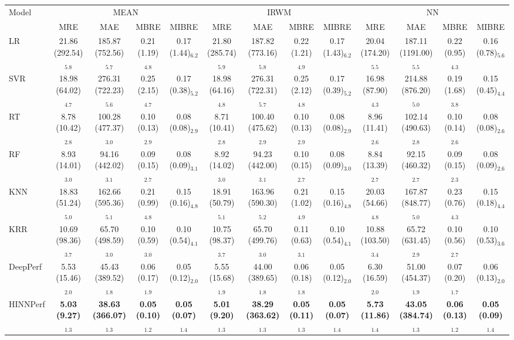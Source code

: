 \begin{tabular}{lcccccccccccc}
\toprule
Model & \multicolumn{4}{c}{MEAN} & \multicolumn{4}{c}{IRWM} & \multicolumn{4}{c}{NN} \\
& MRE & MAE & MBRE & MIBRE & MRE & MAE & MBRE & MIBRE & MRE & MAE & MBRE & MIBRE \\
\midrule
LR & 21.86 (292.54)$_{5.8}$ & 185.87 (752.56)$_{5.7}$ & 0.21 (1.19)$_{4.8}$ & 0.17 (1.44)$_{6.2}$ & 21.80 (285.74)$_{5.9}$ & 187.82 (773.16)$_{5.8}$ & 0.22 (1.21)$_{4.9}$ & 0.17 (1.43)$_{6.2}$ & 20.04 (174.20)$_{5.5}$ & 187.11 (1191.00)$_{5.5}$ & 0.22 (0.95)$_{4.3}$ & 0.16 (0.78)$_{5.6}$ \\
SVR & 18.98 (64.02)$_{4.7}$ & 276.31 (722.23)$_{5.6}$ & 0.25 (2.15)$_{4.7}$ & 0.17 (0.38)$_{5.2}$ & 18.98 (64.16)$_{4.8}$ & 276.31 (722.31)$_{5.7}$ & 0.25 (2.12)$_{4.8}$ & 0.17 (0.39)$_{5.2}$ & 16.98 (87.90)$_{4.3}$ & 214.88 (876.20)$_{5.0}$ & 0.19 (1.68)$_{3.8}$ & 0.15 (0.45)$_{4.4}$ \\
RT & 8.78 (10.42)$_{2.8}$ & 100.28 (477.37)$_{3.0}$ & 0.10 (0.13)$_{2.9}$ & 0.08 (0.08)$_{2.9}$ & 8.71 (10.41)$_{2.8}$ & 100.40 (475.62)$_{2.9}$ & 0.10 (0.13)$_{2.9}$ & 0.08 (0.08)$_{2.9}$ & 8.96 (11.41)$_{2.6}$ & 102.14 (490.63)$_{2.8}$ & 0.10 (0.14)$_{2.6}$ & 0.08 (0.08)$_{2.6}$ \\
RF & 8.93 (14.01)$_{3.0}$ & 94.16 (442.02)$_{3.1}$ & 0.09 (0.15)$_{2.7}$ & 0.08 (0.09)$_{3.1}$ & 8.92 (14.02)$_{3.0}$ & 94.23 (442.00)$_{3.1}$ & 0.10 (0.15)$_{2.7}$ & 0.08 (0.09)$_{3.0}$ & 8.84 (13.39)$_{2.7}$ & 92.15 (460.32)$_{2.7}$ & 0.09 (0.15)$_{2.3}$ & 0.08 (0.09)$_{2.6}$ \\
KNN & 18.83 (51.24)$_{5.0}$ & 162.66 (595.36)$_{5.1}$ & 0.21 (0.99)$_{4.8}$ & 0.15 (0.16)$_{4.8}$ & 18.91 (50.79)$_{5.1}$ & 163.96 (590.30)$_{5.2}$ & 0.21 (1.02)$_{4.9}$ & 0.15 (0.16)$_{4.8}$ & 20.03 (54.66)$_{4.8}$ & 167.87 (848.77)$_{5.0}$ & 0.23 (0.76)$_{4.3}$ & 0.15 (0.18)$_{4.4}$ \\
KRR & 10.69 (98.36)$_{3.7}$ & 65.70 (498.59)$_{3.0}$ & 0.10 (0.59)$_{3.0}$ & 0.10 (0.54)$_{4.1}$ & 10.75 (98.37)$_{3.7}$ & 65.70 (499.76)$_{3.0}$ & 0.11 (0.63)$_{3.1}$ & 0.10 (0.54)$_{4.1}$ & 10.88 (103.50)$_{3.4}$ & 65.72 (631.45)$_{2.9}$ & 0.10 (0.56)$_{2.7}$ & 0.10 (0.53)$_{3.6}$ \\
DeepPerf & 5.53 (15.46)$_{2.0}$ & 45.43 (389.52)$_{1.8}$ & 0.06 (0.17)$_{1.9}$ & 0.05 (0.12)$_{2.0}$ & 5.55 (15.68)$_{1.9}$ & 44.00 (389.65)$_{1.8}$ & 0.06 (0.18)$_{1.8}$ & 0.05 (0.12)$_{2.0}$ & 6.30 (16.59)$_{2.0}$ & 51.00 (454.37)$_{1.9}$ & 0.07 (0.20)$_{1.7}$ & 0.06 (0.13)$_{2.0}$ \\
HINNPerf & \textbf{5.03 (9.27)$_{1.3}$} & \textbf{38.63 (366.07)$_{1.3}$} & \textbf{0.05 (0.10)$_{1.2}$} & \textbf{0.05 (0.07)$_{1.4}$} & \textbf{5.01 (9.20)$_{1.3}$} & \textbf{38.29 (363.62)$_{1.3}$} & \textbf{0.05 (0.11)$_{1.3}$} & \textbf{0.05 (0.07)$_{1.4}$} & \textbf{5.73 (11.86)$_{1.4}$} & \textbf{43.05 (384.74)$_{1.3}$} & \textbf{0.06 (0.13)$_{1.2}$} & \textbf{0.05 (0.09)$_{1.4}$} \\
\bottomrule
\end{tabular}
